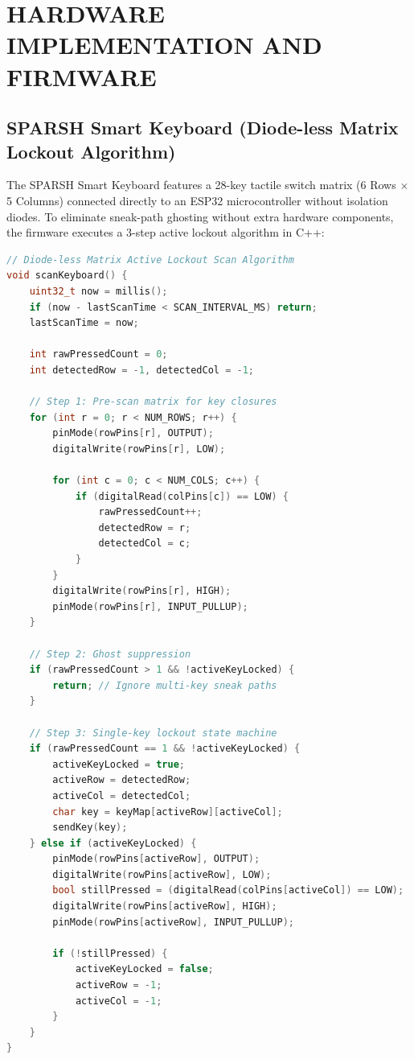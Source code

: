 \documentclass[12pt,a4paper]{report}
\begin{document}
\clearpage
\chapter{HARDWARE IMPLEMENTATION AND FIRMWARE}

\section{SPARSH Smart Keyboard (Diode-less Matrix Lockout Algorithm)}
The SPARSH Smart Keyboard features a 28-key tactile switch matrix (6 Rows $\times$ 5 Columns) connected directly to an ESP32 microcontroller without isolation diodes. To eliminate sneak-path ghosting without extra hardware components, the firmware executes a 3-step active lockout algorithm in C++:

\begin{lstlisting}[language=C++]
// Diode-less Matrix Active Lockout Scan Algorithm
void scanKeyboard() {
    uint32_t now = millis();
    if (now - lastScanTime < SCAN_INTERVAL_MS) return;
    lastScanTime = now;

    int rawPressedCount = 0;
    int detectedRow = -1, detectedCol = -1;

    // Step 1: Pre-scan matrix for key closures
    for (int r = 0; r < NUM_ROWS; r++) {
        pinMode(rowPins[r], OUTPUT);
        digitalWrite(rowPins[r], LOW);

        for (int c = 0; c < NUM_COLS; c++) {
            if (digitalRead(colPins[c]) == LOW) {
                rawPressedCount++;
                detectedRow = r;
                detectedCol = c;
            }
        }
        digitalWrite(rowPins[r], HIGH);
        pinMode(rowPins[r], INPUT_PULLUP);
    }

    // Step 2: Ghost suppression
    if (rawPressedCount > 1 && !activeKeyLocked) {
        return; // Ignore multi-key sneak paths
    }

    // Step 3: Single-key lockout state machine
    if (rawPressedCount == 1 && !activeKeyLocked) {
        activeKeyLocked = true;
        activeRow = detectedRow;
        activeCol = detectedCol;
        char key = keyMap[activeRow][activeCol];
        sendKey(key);
    } else if (activeKeyLocked) {
        pinMode(rowPins[activeRow], OUTPUT);
        digitalWrite(rowPins[activeRow], LOW);
        bool stillPressed = (digitalRead(colPins[activeCol]) == LOW);
        digitalWrite(rowPins[activeRow], HIGH);
        pinMode(rowPins[activeRow], INPUT_PULLUP);

        if (!stillPressed) {
            activeKeyLocked = false;
            activeRow = -1;
            activeCol = -1;
        }
    }
}
\end{lstlisting}
\end{document}
